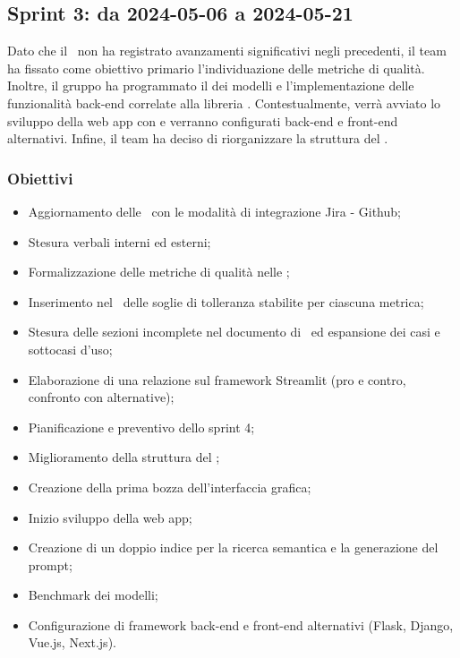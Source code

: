 \subsection{Sprint 3: da 2024-05-06 a 2024-05-21}
\par Dato che il \PdQ\ non ha registrato avanzamenti significativi negli  precedenti, il team ha fissato come obiettivo primario l'individuazione delle metriche di qualità. Inoltre, il gruppo ha programmato il  dei modelli e l'implementazione delle funzionalità back-end correlate alla libreria . Contestualmente, verrà avviato lo sviluppo della web app con  e verranno configurati  back-end e front-end alternativi. Infine, il team ha deciso di riorganizzare la struttura del \PdP.

\subsubsection{Obiettivi}
\begin{itemize}
  \item Aggiornamento delle \NdP\ con le modalità di integrazione Jira - Github;
  \item Stesura verbali interni ed esterni;
  \item Formalizzazione delle metriche di qualità nelle \NdP;
  \item Inserimento nel \PdQ\ delle soglie di tolleranza stabilite per ciascuna metrica;
  \item Stesura delle sezioni incomplete nel documento di \AdR\ ed espansione dei casi e sottocasi d'uso;
  \item Elaborazione di una relazione sul framework Streamlit (pro e contro, confronto con alternative);
  \item Pianificazione e preventivo dello sprint 4;
  \item Miglioramento della struttura del \PdP;
  \item Creazione della prima bozza dell'interfaccia grafica;
  \item Inizio sviluppo della web app;
  \item Creazione di un doppio indice per la ricerca semantica e la generazione del prompt;
  \item Benchmark dei modelli;
  \item Configurazione di framework back-end e front-end alternativi (Flask, Django, Vue.js, Next.js).
\end{itemize}

